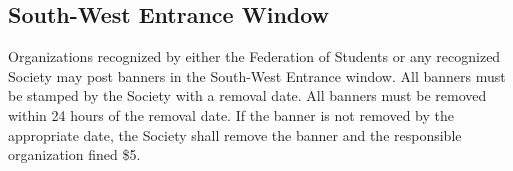 \subsection{South-West Entrance Window}
Organizations recognized by either the Federation of Students or any recognized Society may post banners in the South-West Entrance window.
All banners must be stamped by the Society with a removal date.
All banners must be removed within 24 hours of the removal date. If the banner is not removed by the appropriate date, the Society shall remove the banner and the responsible organization fined \$5.